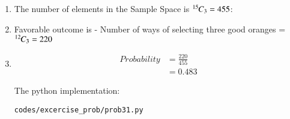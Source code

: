 \renewcommand{\theequation}{\theenumi}
\begin{enumerate}

\item The number of elements in the Sample Space is ${{}^{15}\mkern-1muC_{3}} = 455$:

\item Favorable outcome is - Number of ways of selecting three good oranges = ${{}^{12}\mkern-1muC_{3}} = 220$
 
\item 
\begin{align}
Probability &= \frac{220}{455}\\
&= 0.483\label{eq:ans_ex_31}
\end{align} 


The python implementation:
\begin{lstlisting}
codes/excercise_prob/prob31.py
\end{lstlisting}


\end{enumerate}